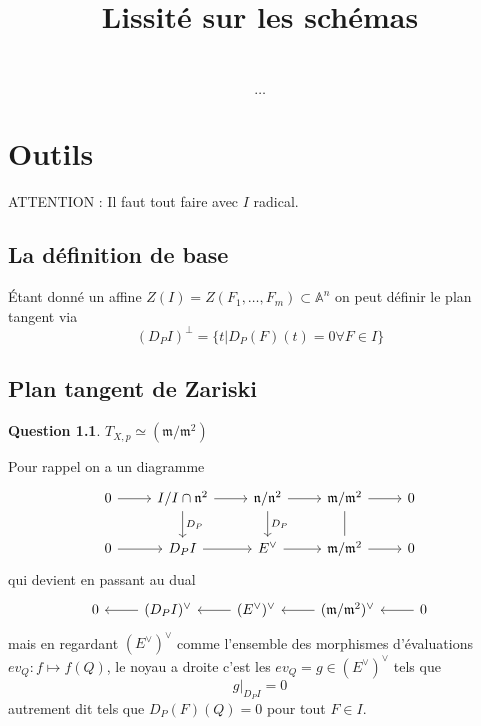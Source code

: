\documentclass[a4paper,12pt]{book}
\title{Lissité sur les schémas}
\date{}
\newcommand{\A}{\mathbb{A}}
\newcommand{\m}{\mathfrak{m}}
\theoremstyle{plain}
\theoremstyle{definition}
\newtheorem{quest}{Question}
\theoremstyle{remark}
\begin{document}
\maketitle
\tableofcontents
\[\ldots\]   

\chapter{Outils}
ATTENTION : Il faut tout faire avec $I$ radical.
\section{La définition de base}
Étant donné un affine $Z(I)=Z(F_1,\ldots, F_m)\subset\A^n$ 
on peut définir le plan tangent via
\[(D_PI)^\perp =\{t| D_P(F)(t)=0 \forall F\in I\}\]
\section{Plan tangent de Zariski}
\begin{quest}
    $T_{X,p}\simeq (\m/\m^2)$
\end{quest}
Pour rappel on a un diagramme 
\[\begin{tikzcd}
	0 & {I/I\cap \mathfrak n^2} & {\mathfrak n/\mathfrak n^2} & {\mathfrak m/\mathfrak m^2} & 0 \\
	0 & {D_PI} & {E^\vee} & {\mathfrak m/\mathfrak m^2} & 0
	\arrow[from=1-1, to=1-2]
	\arrow[from=1-2, to=1-3]
	\arrow["{D_P}", from=1-2, to=2-2]
	\arrow[from=1-3, to=1-4]
	\arrow["{D_P}", from=1-3, to=2-3]
	\arrow[from=1-4, to=1-5]
	\arrow[no head, from=1-4, to=2-4]
	\arrow[from=2-1, to=2-2]
	\arrow[from=2-2, to=2-3]
	\arrow[from=2-3, to=2-4]
	\arrow[from=2-4, to=2-5]
\end{tikzcd}\]
qui devient en passant au dual
\[\begin{tikzcd}
	0 & {(D_PI)^\vee} & {(E^\vee)^\vee} & {(\mathfrak m/\mathfrak m^2)^\vee} & 0
	\arrow[from=1-2, to=1-1]
	\arrow[from=1-3, to=1-2]
	\arrow[from=1-4, to=1-3]
	\arrow[from=1-5, to=1-4]
\end{tikzcd}\]
mais en regardant $(E^\vee)^\vee$ comme l'ensemble des
morphismes d'évaluations $ev_Q\colon f\mapsto f(Q)$, le noyau 
a droite c'est les $ev_Q=g\in(E^\vee)^\vee$ tels que 
\[g|_{D_PI}=0\] autrement dit tels que $D_P(F)(Q)=0$ pour tout
$F\in I$.
\end{document}
